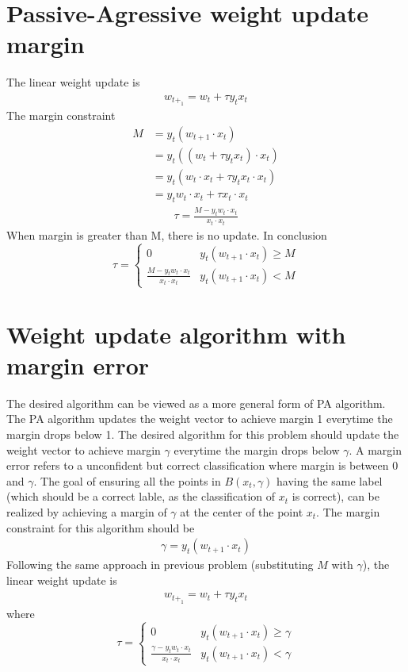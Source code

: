 \documentclass[12pt]{article}
\begin{document}
\section{Passive-Agressive weight update margin}
The linear weight update is
\begin{align}
  w_{t+_1} = w_{t} + \tau y_{t} x_{t}
\end{align}
The margin constraint
\begin{align}
  M
  &= y_{t} (w_{t+1} \cdot x_{t})\\
  &= y_{t} ((w_{t} + \tau y_{t} x_{t}) \cdot x_{t})\\
  &= y_{t} (w_{t} \cdot x_{t} + \tau y_{t} x_{t} \cdot x_{t})\\
  &= y_{t} w_{t} \cdot x_{t} + \tau x_{t} \cdot x_{t}
\end{align}
\begin{align}
  \tau = \frac{M - y_{t} w_{t} \cdot x_{t}}{ x_{t} \cdot x_{t}}
\end{align}
When margin is greater than M, there is no update. In conclusion
\begin{equation}
  \tau =
  \begin{cases}
      0 & y_{t} (w_{t+1} \cdot x_{t}) \geq M \\
      \frac{M - y_{t} w_{t} \cdot x_{t}}{ x_{t} \cdot x_{t}} & y_{t} (w_{t+1} \cdot x_{t}) < M
  \end{cases}
\end{equation}

\section{Weight update algorithm with margin error}
The desired algorithm can be viewed as a more general form of PA algorithm. The PA algorithm updates the weight vector to achieve margin 1 everytime the margin drops below 1. The desired algorithm for this problem should update the weight vector to achieve margin $\gamma$ everytime the margin drops below $\gamma$. A margin error refers to a unconfident but correct classification where margin is between 0 and $\gamma$. The goal of ensuring all the points in $B(x_{t},\gamma)$ having the same label (which should be a correct lable, as the classification of $x_{t}$ is correct), can be realized by achieving a margin of $\gamma$ at the center of the point $x_{t}$. The margin constraint for this algorithm should be
\begin{align}
  \gamma = y_{t} (w_{t+1} \cdot x_{t})
\end{align}
Following the same approach in previous problem (substituting $M$ with $\gamma $), the linear weight update is
\begin{align}
  w_{t+_1} = w_{t} + \tau y_{t} x_{t}
\end{align}
where
\begin{equation}
  \tau =
  \begin{cases}
      0 & y_{t} (w_{t+1} \cdot x_{t}) \geq \gamma  \\
      \frac{\gamma  - y_{t} w_{t} \cdot x_{t}}{ x_{t} \cdot x_{t}} & y_{t} (w_{t+1} \cdot x_{t}) < \gamma 
  \end{cases}
\end{equation}
\end{document}
